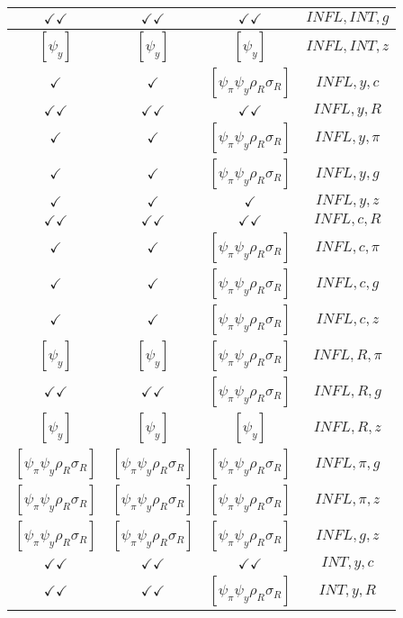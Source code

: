 \documentclass[a4paper,10pt]{article}
\begin{document}
\begin{longtable}{|c|c|c|c|}
\hline
$\checkmark\checkmark$ & $\checkmark\checkmark$ & $\checkmark\checkmark$ & ${INFL},{INT},{g}$ \\
\hline
$[\psi_y ]$ & $[\psi_y ]$ & $[\psi_y ]$ & ${INFL},{INT},{z}$ \\
\hline
$\checkmark$ & $\checkmark$ & $[\psi_\pi \psi_y \rho_R \sigma_R ]$ & ${INFL},{y},{c}$ \\
\hline
$\checkmark\checkmark$ & $\checkmark\checkmark$ & $\checkmark\checkmark$ & ${INFL},{y},{R}$ \\
\hline
$\checkmark$ & $\checkmark$ & $[\psi_\pi \psi_y \rho_R \sigma_R ]$ & ${INFL},{y},{\pi}$ \\
\hline
$\checkmark$ & $\checkmark$ & $[\psi_\pi \psi_y \rho_R \sigma_R ]$ & ${INFL},{y},{g}$ \\
\hline
$\checkmark$ & $\checkmark$ & $\checkmark$ & ${INFL},{y},{z}$ \\
\hline
$\checkmark\checkmark$ & $\checkmark\checkmark$ & $\checkmark\checkmark$ & ${INFL},{c},{R}$ \\
\hline
$\checkmark$ & $\checkmark$ & $[\psi_\pi \psi_y \rho_R \sigma_R ]$ & ${INFL},{c},{\pi}$ \\
\hline
$\checkmark$ & $\checkmark$ & $[\psi_\pi \psi_y \rho_R \sigma_R ]$ & ${INFL},{c},{g}$ \\
\hline
$\checkmark$ & $\checkmark$ & $[\psi_\pi \psi_y \rho_R \sigma_R ]$ & ${INFL},{c},{z}$ \\
\hline
$[\psi_y ]$ & $[\psi_y ]$ & $[\psi_\pi \psi_y \rho_R \sigma_R ]$ & ${INFL},{R},{\pi}$ \\
\hline
$\checkmark\checkmark$ & $\checkmark\checkmark$ & $[\psi_\pi \psi_y \rho_R \sigma_R ]$ & ${INFL},{R},{g}$ \\
\hline
$[\psi_y ]$ & $[\psi_y ]$ & $[\psi_y ]$ & ${INFL},{R},{z}$ \\
\hline
$[\psi_\pi \psi_y \rho_R \sigma_R ]$ & $[\psi_\pi \psi_y \rho_R \sigma_R ]$ & $[\psi_\pi \psi_y \rho_R \sigma_R ]$ & ${INFL},{\pi},{g}$ \\
\hline
$[\psi_\pi \psi_y \rho_R \sigma_R ]$ & $[\psi_\pi \psi_y \rho_R \sigma_R ]$ & $[\psi_\pi \psi_y \rho_R \sigma_R ]$ & ${INFL},{\pi},{z}$ \\
\hline
$[\psi_\pi \psi_y \rho_R \sigma_R ]$ & $[\psi_\pi \psi_y \rho_R \sigma_R ]$ & $[\psi_\pi \psi_y \rho_R \sigma_R ]$ & ${INFL},{g},{z}$ \\
\hline
$\checkmark\checkmark$ & $\checkmark\checkmark$ & $\checkmark\checkmark$ & ${INT},{y},{c}$ \\
\hline
$\checkmark\checkmark$ & $\checkmark\checkmark$ & $[\psi_\pi \psi_y \rho_R \sigma_R ]$ & ${INT},{y},{R}$ \\

\end{longtable}
\end{document}
